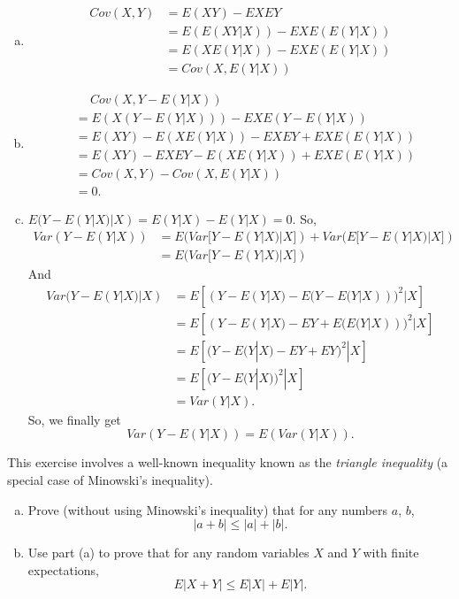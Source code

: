 \documentclass[14pt]{elegantbook}
\begin{document}
    \begin{solution}
        \begin{enumerate}[(a)]
            \item \begin{align*}
                Cov(X, Y)&=E(XY)-EXEY\\
                &=E(E(XY|X))-EXE(E(Y|X))\\
                &=E(XE(Y|X))-EXE(E(Y|X))\\
                &=Cov(X, E(Y|X))
            \end{align*}
            \item \begin{align*}
                &\quad\ Cov(X, Y-E(Y|X))\\
                &=E(X(Y-E(Y|X)))-EXE(Y-E(Y|X))\\
                &=E(XY)-E(XE(Y|X))-EXEY+EXE(E(Y|X))\\
                &=E(XY)-EXEY-E(XE(Y|X))+EXE(E(Y|X))\\
                &=Cov(X, Y)-Cov(X, E(Y|X))\\
                &=0.
            \end{align*}
            \item \(E(Y-E(Y|X)|X)=E(Y|X)-E(Y|X)=0\). So, 
            \begin{align*}
                Var(Y-E(Y|X))
                &=E(Var[Y-E(Y|X)|X])+Var(E[Y-E(Y|X)|X])\\
                &=E(Var[Y-E(Y|X)|X])
            \end{align*}
            And \begin{align*}
                Var(Y-E(Y|X)|X)&=E[(Y-E(Y|X)-E(Y-E(Y|X)))^2|X]\\
                &=E[(Y-E(Y|X)-EY+E(E(Y|X)))^2|X]\\
                &=E[(Y-E(Y|X)-EY+EY)^2|X]\\
                &=E[(Y-E(Y|X))^2|X]\\
                &=Var(Y|X).
            \end{align*}
            So, we finally get 
            \[Var(Y-E(Y|X))=E(Var(Y|X)). \]
        \end{enumerate}
    \end{solution}

    \setcounter{exer}{63}
    \begin{exercise}
        This exercise involves a well-known inequality known as the \emph{triangle inequality} (a special case of Minowski's inequality).
        \begin{enumerate}[(a)]
            \item Prove (without using Minowski's inequality) that for any numbers $a$, $b$, 
            \[|a+b|\leq |a|+|b|. \]
            \item Use part (a) to prove that for any random variables $X$ and $Y$ with finite expectations,
            \[E|X+Y|\leq E|X|+E|Y|. \]
        \end{enumerate}
    \end{exercise}
\end{document}

